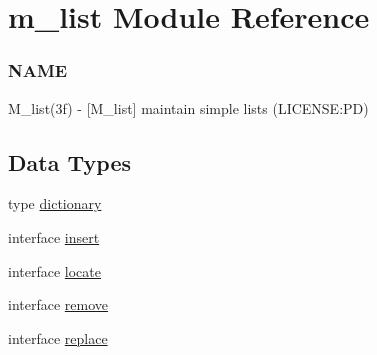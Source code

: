\hypertarget{namespacem__list}{}\section{m\+\_\+list Module Reference}
\label{namespacem__list}


\subsubsection*{N\+A\+ME}

M\+\_\+list(3f) -\/ \mbox{[}M\+\_\+list\mbox{]} maintain simple lists (L\+I\+C\+E\+N\+SE\+:PD)  


\subsection*{Data Types}
\begin{DoxyCompactItemize}
\item 
type \mbox{\hyperlink{structm__list_1_1dictionary}{dictionary}}
\item 
interface \mbox{\hyperlink{interfacem__list_1_1insert}{insert}}
\item 
interface \mbox{\hyperlink{interfacem__list_1_1locate}{locate}}
\item 
interface \mbox{\hyperlink{interfacem__list_1_1remove}{remove}}
\item 
interface \mbox{\hyperlink{interfacem__list_1_1replace}{replace}}
\end{DoxyCompactItemize}
